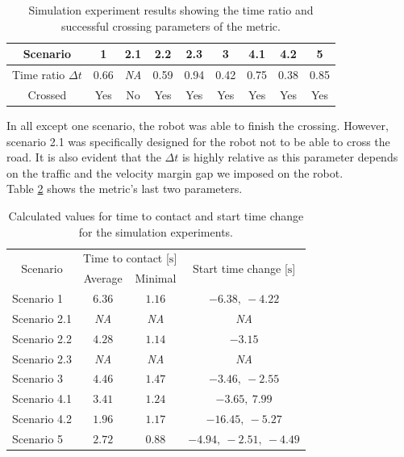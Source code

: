         \begin{table}[H]
            \centering
            \begin{tabular}{|c||c|c|c|c|c|c|c|c|}
                \hline
                Scenario & 1 & 2.1 & 2.2 & 2.3 & 3 & 4.1 & 4.2 & 5 \\
                \hline
                Time ratio $\Delta t$ & 0.66 & \emph{NA} & 0.59 & 0.94 & 0.42 & 0.75 & 0.38 & 0.85 \\
                \hline
                Crossed & Yes & No & Yes & Yes & Yes & Yes & Yes & Yes \\
                \hline
            \end{tabular}
            \caption{Simulation experiment results showing the time ratio and successful crossing parameters of the metric.}
            \label{tab:met1}
        \end{table}
        \noindent In all except one scenario, the robot was able to finish the crossing. However, scenario 2.1 was specifically designed for the robot not to be able to cross the road. It is also evident that the $\Delta t$ is highly relative as this parameter depends on the traffic and the velocity margin gap we imposed on the robot.\\
        Table \ref{tab:times} shows the metric's last two parameters.
        \begin{table}[H]
            \centering
            \begin{tabular}{|c|c c|c|}
                \hline
                \multirow{2}{4em}{Scenario} & \multicolumn{2}{c|}{Time to contact [$\si{\s}$]} & \multirow{2}{9em}{Start time change [$\si{\s}$]}\\
                & Average & Minimal & \\
                \hline\hline
                \multicolumn{1}{|l|}{Scenario 1} & $6.36$ & $1.16$ & $-6.38,\ -4.22$ \\
                \hline
                Scenario 2.1 & \emph{NA} & \emph{NA} & \emph{NA} \\
                \hline
                Scenario 2.2 & $4.28$ & $1.14$ & $-3.15$ \\
                \hline
                Scenario 2.3 & \emph{NA} & \emph{NA} & \emph{NA} \\
                \hline
                \multicolumn{1}{|l|}{Scenario 3} & $4.46$ & $1.47$ & $-3.46,\ -2.55$ \\
                \hline
                Scenario 4.1 & $3.41$ & $1.24$ & $-3.65,\ 7.99$ \\
                \hline
                Scenario 4.2 & $1.96$ & $1.17$ & $-16.45,\ -5.27$ \\
                \hline
                \multicolumn{1}{|l|}{Scenario 5} & $2.72$ & $0.88$ & $-4.94,\ -2.51,\ -4.49$ \\
                \hline
            \end{tabular}
            \caption{Calculated values for time to contact and start time change for the simulation experiments.}
            \label{tab:times}
        \end{table}
